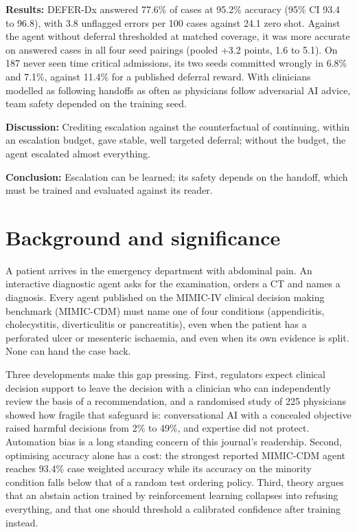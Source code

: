 \documentclass[11pt]{article}
\begin{document}
\noindent\textbf{Results:} DEFER-Dx answered 77.6\% of cases at 95.2\% accuracy (95\% CI 93.4 to 96.8), with 3.8 unflagged errors per 100 cases against 24.1 zero shot. Against the agent without deferral thresholded at matched coverage, it was more accurate on answered cases in all four seed pairings (pooled +3.2 points, 1.6 to 5.1). On 187 never seen time critical admissions, its two seeds committed wrongly in 6.8\% and 7.1\%, against 11.4\% for a published deferral reward. With clinicians modelled as following handoffs as often as physicians follow adversarial AI advice, team safety depended on the training seed.

\noindent\textbf{Discussion:} Crediting escalation against the counterfactual of continuing, within an escalation budget, gave stable, well targeted deferral; without the budget, the agent escalated almost everything.

\noindent\textbf{Conclusion:} Escalation can be learned; its safety depends on the handoff, which must be trained and evaluated against its reader.

\newpage
\linenumbers
\onehalfspacing

\section*{Background and significance}

A patient arrives in the emergency department with abdominal pain. An interactive diagnostic agent asks for the examination, orders a CT and names a diagnosis. Every agent published on the MIMIC-IV clinical decision making benchmark (MIMIC-CDM)\cite{hager2024} must name one of four conditions (appendicitis, cholecystitis, diverticulitis or pancreatitis), even when the patient has a perforated ulcer or mesenteric ischaemia, and even when its own evidence is split. None can hand the case back.

Three developments make this gap pressing. First, regulators expect clinical decision support to leave the decision with a clinician who can independently review the basis of a recommendation\cite{fda2026}, and a randomised study of 225 physicians showed how fragile that safeguard is: conversational AI with a concealed objective raised harmful decisions from 2\% to 49\%, and expertise did not protect\cite{barrit2026}. Automation bias is a long standing concern of this journal's readership\cite{goddard2012}. Second, optimising accuracy alone has a cost: the strongest reported MIMIC-CDM agent reaches 93.4\% case weighted accuracy while its accuracy on the minority condition falls below that of a random test ordering policy\cite{ldtl}. Third, theory argues that an abstain action trained by reinforcement learning collapses into refusing everything, and that one should threshold a calibrated confidence after training instead\cite{che2026}.
\end{document}
